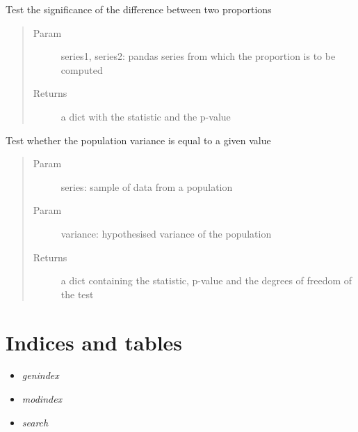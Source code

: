 \documentclass[letterpaper,10pt,english]{sphinxmanual}
\begin{document}

\begin{fulllineitems}
\label{index:tests.tests.test_proportions}
Test the significance of the difference between two proportions
\begin{quote}\begin{description}
\item[{Param}] \leavevmode
series1, series2: pandas series from which the proportion is to be computed

\item[{Returns}] \leavevmode
a dict with the statistic and the p-value

\end{description}\end{quote}

\end{fulllineitems}


\begin{fulllineitems}
\label{index:tests.tests.test_variance}
Test whether the population variance is equal to a given value
\begin{quote}\begin{description}
\item[{Param}] \leavevmode
series: sample of data from a population

\item[{Param}] \leavevmode
variance: hypothesised variance of the population

\item[{Returns}] \leavevmode
a dict containing the statistic, p-value and the degrees of freedom of the test

\end{description}\end{quote}

\end{fulllineitems}



\chapter{Indices and tables}
\label{index:indices-and-tables}\begin{itemize}
\item {} 
\emph{genindex}

\item {} 
\emph{modindex}

\item {} 
\emph{search}

\end{itemize}
\end{document}
